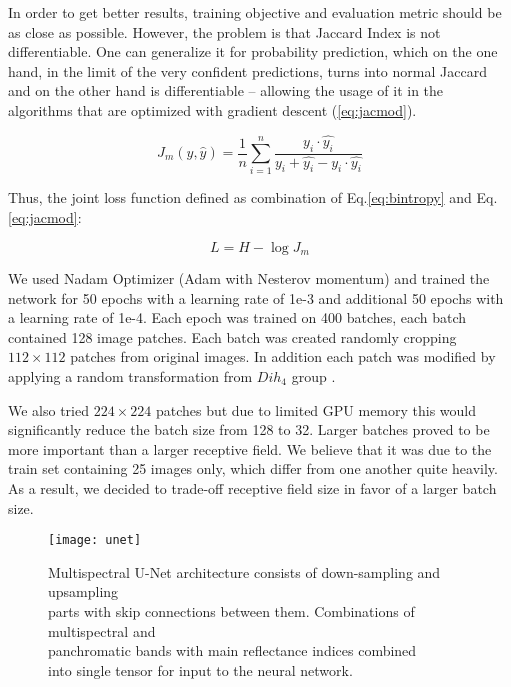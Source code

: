\documentclass[10pt,twocolumn,letterpaper]{article}
\begin{document}
In order to get better results, training objective and evaluation metric should be as close as possible. However, the problem is that Jaccard Index is not differentiable. One can generalize it for probability prediction, which on the one hand, in the limit of the very confident predictions, turns into normal Jaccard and on the other hand is differentiable – allowing the usage of it in the algorithms that are optimized with gradient descent (\ref{eq:jacmod}).

\begin{equation} \label{eq:jacmod}
J_{m}(y, \widehat{y}) = \frac{1}{n} \sum_{i=1}^n \frac{y_i \cdot \widehat{y_i}}{y_i + \widehat{y_i} - y_i \cdot \widehat{y_i}}
\end{equation}

Thus, the joint loss function defined as combination of Eq.\ref{eq:bintropy} and Eq.\ref{eq:jacmod}:

\begin{equation}
L = H - \log J_{m}
\end{equation}

We used Nadam Optimizer (Adam with Nesterov momentum) \cite{nadam} and trained the network for 50 epochs with a learning rate of 1e-3 and additional 50 epochs with a learning rate of 1e-4. Each epoch was trained on 400 batches, each batch contained 128 image patches. Each batch was created randomly cropping $112 \times 112$ patches from original images. In addition each patch was modified by applying a random transformation from $Dih_4$ group \cite{D4}.

We also tried $224 \times 224$ patches but due to limited GPU memory this would significantly reduce the batch size from 128 to 32. Larger batches proved to be more important than a larger receptive field. We believe that it was due to the train set containing 25 images only, which differ from one another quite heavily. As a result, we decided to trade-off receptive field size in favor of a larger batch size.

\begin{figure*}[th]
	\centering
	\texttt{[image: unet]}
	\captionsetup{justification=centering}
	\caption{Multispectral U-Net architecture consists of down-sampling and upsampling \\ parts with skip connections between them.  Combinations of multispectral and \\ panchromatic bands with main reflectance indices combined \\ into single tensor for input to the neural network. }
	\label{fig:unet}
\end{figure*}
\end{document}
